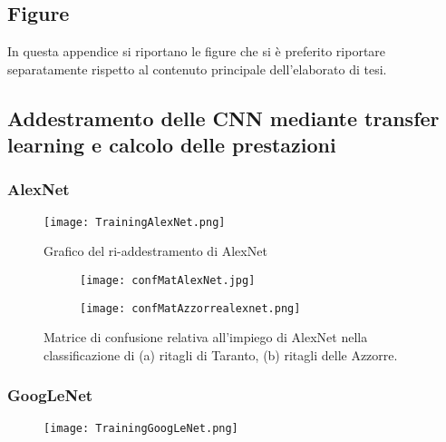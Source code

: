 \begin{appendices}


\renewcommand{\thechapter}{A}
\chapter{Figure}
\label{immagini}
In questa appendice si riportano le figure che si è preferito riportare separatamente rispetto al contenuto principale dell'elaborato di tesi.

\vfill
\pagebreak[4]

\section{Addestramento delle CNN mediante transfer learning e calcolo delle prestazioni}

\subsection{AlexNet}

\begin{figure}[h!]
  \centering
  \texttt{[image: TrainingAlexNet.png]}
  
  \caption{Grafico del ri-addestramento di AlexNet}

\end{figure}


\begin{figure}[h!]
  \centering
  \begin{subfigure}[b]{0.45\linewidth}
    \texttt{[image: confMatAlexNet.jpg]}
    \caption{}
  \end{subfigure}
  \begin{subfigure}[b]{0.45\linewidth}
    \texttt{[image: confMatAzzorrealexnet.png]}
    \caption{}
  \end{subfigure}
  
  \caption{Matrice di confusione relativa all'impiego di AlexNet nella classificazione di (a) ritagli di Taranto, (b) ritagli delle Azzorre.}

\end{figure}

\vfill
\pagebreak[4]

\subsection{GoogLeNet}

\begin{figure}[h!]
  \centering
  \texttt{[image: TrainingGoogLeNet.png]}
  

\end{figure}
\end{appendices}
